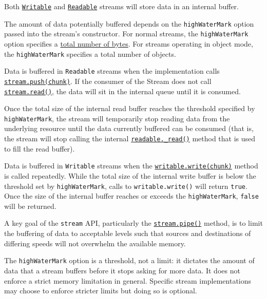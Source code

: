 Both \hyperref[class-streamwritable]{\texttt{Writable}} and
\hyperref[class-streamreadable]{\texttt{Readable}} streams will store
data in an internal buffer.

The amount of data potentially buffered depends on the
\texttt{highWaterMark} option passed into the stream's constructor. For
normal streams, the \texttt{highWaterMark} option specifies a
\hyperref[highwatermark-discrepancy-after-calling-readablesetencoding]{total
number of bytes}. For streams operating in object mode, the
\texttt{highWaterMark} specifies a total number of objects.

Data is buffered in \texttt{Readable} streams when the implementation
calls
\hyperref[readablepushchunk-encoding]{\texttt{stream.push(chunk)}}. If
the consumer of the Stream does not call
\hyperref[readablereadsize]{\texttt{stream.read()}}, the data will sit
in the internal queue until it is consumed.

Once the total size of the internal read buffer reaches the threshold
specified by \texttt{highWaterMark}, the stream will temporarily stop
reading data from the underlying resource until the data currently
buffered can be consumed (that is, the stream will stop calling the
internal \hyperref[readable_readsize]{\texttt{readable.\_read()}} method
that is used to fill the read buffer).

Data is buffered in \texttt{Writable} streams when the
\hyperref[writablewritechunk-encoding-callback]{\texttt{writable.write(chunk)}}
method is called repeatedly. While the total size of the internal write
buffer is below the threshold set by \texttt{highWaterMark}, calls to
\texttt{writable.write()} will return \texttt{true}. Once the size of
the internal buffer reaches or exceeds the \texttt{highWaterMark},
\texttt{false} will be returned.

A key goal of the \texttt{stream} API, particularly the
\hyperref[readablepipedestination-options]{\texttt{stream.pipe()}}
method, is to limit the buffering of data to acceptable levels such that
sources and destinations of differing speeds will not overwhelm the
available memory.

The \texttt{highWaterMark} option is a threshold, not a limit: it
dictates the amount of data that a stream buffers before it stops asking
for more data. It does not enforce a strict memory limitation in
general. Specific stream implementations may choose to enforce stricter
limits but doing so is optional.

